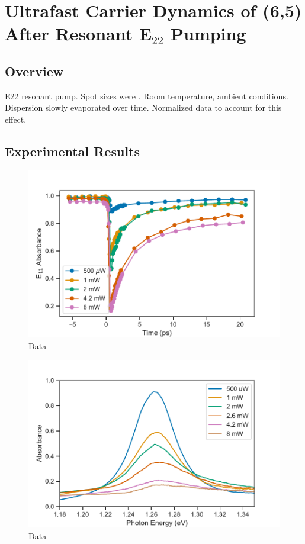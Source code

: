 \chapter{Ultrafast Carrier Dynamics of (6,5) After Resonant E$_{22}$ Pumping}

\section{Overview}

E22 resonant pump. Spot sizes were . Room temperature, ambient conditions. Dispersion slowly evaporated over time. Normalized data to account for this effect. 

\section{Experimental Results}

\begin{figure}[H]
	\centering
	\includegraphics[scale=0.75]{images/chapter_my_data/absorbance_dynamics_E11}
	\caption{Data}
\end{figure}

\begin{figure}[H]
	\centering
	\includegraphics[scale=0.75]{images/chapter_my_data/peak_abs_vs_pump}
	\caption{Data}
\end{figure}

